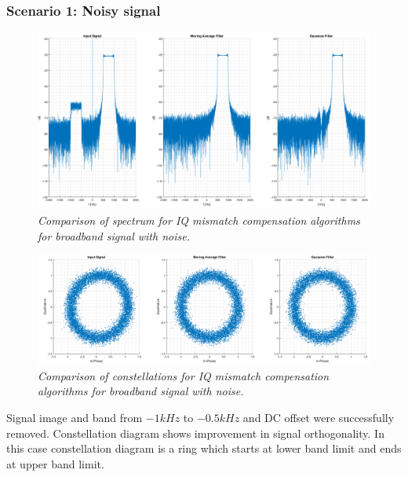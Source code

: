 \documentclass[en,printmode]{mgr}
\begin{document}
		\subsubsection*{Scenario 1: Noisy signal}
			\begin{figure}[!htb]
    			\centering
   				\includegraphics[width=\textwidth]{plots/band_nf.png}
   		 		\caption{\textit{Comparison of spectrum for IQ mismatch compensation algorithms for
   		 		broadband signal with noise.}}
   		 	\end{figure}	
   		 	\begin{figure}[!htb]
    			\centering
   				\includegraphics[width=\textwidth]{plots/band_nc.png}
   		 		\caption{\textit{Comparison of constellations for IQ mismatch compensation algorithms 
   		 		for broadband signal with noise.}}
   		 	\end{figure}
   		 	
			Signal image and band from $-1kHz$ to $-0.5kHz$ and DC offset were successfully removed.
			Constellation diagram shows improvement in signal orthogonality. In this case constellation
			diagram is a ring which starts at lower band limit and ends at upper band limit.    		 	
   		 	
   	\newpage	
\end{document}
